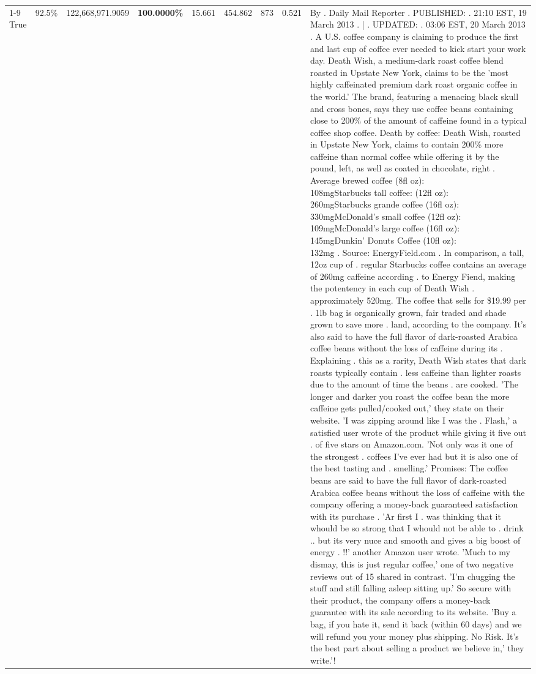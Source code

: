 \begin{table}[H]
{\begin{tabular}{lllrlllll}
\cline{1-9}
True & 92.5\% & 122,668,971.9059 & \bfseries \color{red} 100.0000\% & 15.661 & 454.862 & 873 & 0.521 & By . Daily Mail Reporter . PUBLISHED: . 21:10 EST, 19 March 2013 . | . UPDATED: . 03:06 EST, 20 March 2013 . A U.S. coffee company is claiming to produce the first and last cup of coffee ever needed to kick start your work day. Death Wish, a medium-dark roast coffee blend roasted in Upstate New York, claims to be the 'most highly caffeinated premium dark roast organic coffee in the world.' The brand, featuring a menacing black skull and cross bones, says they use coffee beans containing close to 200\% of the amount of caffeine found in a typical coffee shop coffee. Death by coffee: Death Wish, roasted in Upstate New York, claims to contain 200\% more caffeine than normal coffee while offering it by the pound, left, as well as coated in chocolate, right . Average brewed coffee (8fl oz):              108mgStarbucks tall coffee: (12fl oz):                260mgStarbucks grande coffee (16fl oz):         330mgMcDonald's small coffee (12fl oz):           109mgMcDonald's large coffee (16fl oz):           145mgDunkin' Donuts Coffee (10fl oz):             132mg . Source: EnergyField.com . In comparison, a tall, 12oz cup of . regular Starbucks coffee contains an average of 260mg caffeine according . to Energy Fiend, making the potentency in each cup of Death Wish . approximately 520mg. The coffee that sells for \$19.99 per . 1lb bag is organically grown, fair traded and shade grown to save more . land, according to the company. It's also said to have the full flavor of dark-roasted Arabica coffee beans without the loss of caffeine during its . Explaining . this as a rarity, Death Wish states that dark roasts typically contain . less caffeine than lighter roasts due to the amount of time the beans . are cooked. 'The longer and darker you roast the coffee bean the more caffeine gets pulled/cooked out,' they state on their website. 'I was zipping around like I was the . Flash,' a satisfied user wrote of the product while giving it five out . of five stars on Amazon.com. 'Not only was it one of the strongest . coffees I've ever had but it is also one of the best tasting and . smelling.’ Promises: The coffee beans are said to have the full flavor of dark-roasted Arabica coffee beans without the loss of caffeine with the company offering a money-back guaranteed satisfaction with its purchase . 'Ar first I . was thinking that it whould be so strong that I whould not be able to . drink .. but its very nuce and smooth and gives a big boost of energy . !!' another Amazon user wrote. 'Much to my dismay, this is just regular coffee,' one of two negative reviews out of 15 shared in contrast. 'I'm chugging the stuff and still falling asleep sitting up.' So secure with their product, the company offers a money-back guarantee with its sale according to its website. 'Buy a bag, if you hate it, send it back (within 60 days) and we will refund you your money plus shipping. No Risk. It’s the best part about selling a product we believe in,' they write.'! \\

\end{tabular}}
\end{table}
